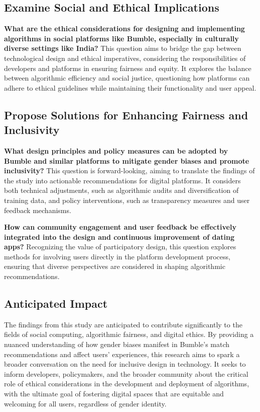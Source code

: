 \subsection{Examine Social and Ethical Implications}
\textbf{What are the ethical considerations for designing and implementing algorithms in social platforms like Bumble, especially in culturally diverse settings like India?}
This question aims to bridge the gap between technological design and ethical imperatives, considering the responsibilities of developers and platforms in ensuring fairness and equity. It explores the balance between algorithmic efficiency and social justice, questioning how platforms can adhere to ethical guidelines while maintaining their functionality and user appeal.

\subsection{Propose Solutions for Enhancing Fairness and Inclusivity}
\textbf{What design principles and policy measures can be adopted by Bumble and similar platforms to mitigate gender biases and promote inclusivity?}
This question is forward-looking, aiming to translate the findings of the study into actionable recommendations for digital platforms. It considers both technical adjustments, such as algorithmic audits and diversification of training data, and policy interventions, such as transparency measures and user feedback mechanisms.

\textbf{ How can community engagement and user feedback be effectively integrated into the design and continuous improvement of dating apps?}
Recognizing the value of participatory design, this question explores methods for involving users directly in the platform development process, ensuring that diverse perspectives are considered in shaping algorithmic recommendations.

\subsection{Anticipated Impact}
The findings from this study are anticipated to contribute significantly to the fields of social computing, algorithmic fairness, and digital ethics. By providing a nuanced understanding of how gender biases manifest in Bumble’s match recommendations and affect users’ experiences, this research aims to spark a broader conversation on the need for inclusive design in technology. It seeks to inform developers, policymakers, and the broader community about the critical role of ethical considerations in the development and deployment of algorithms, with the ultimate goal of fostering digital spaces that are equitable and welcoming for all users, regardless of gender identity.

